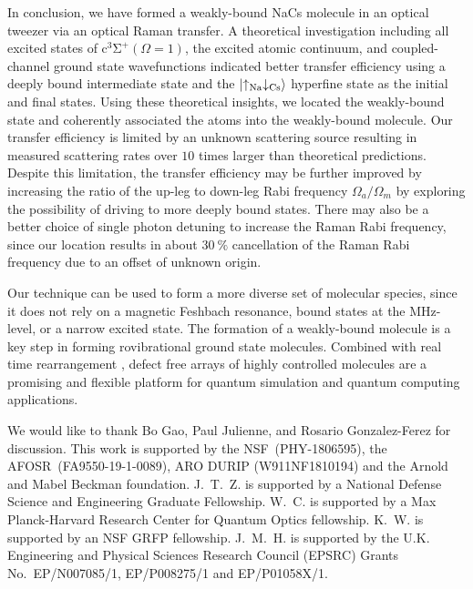 \documentclass[aps,prl,twocolumn,10pt,superscriptaddress]{revtex4-1}
\newcommand{\Na}{\mathrm{Na}}
\newcommand{\Cs}{\mathrm{Cs}}
\newcommand{\todo}[1]{}
\begin{document}
In conclusion, we have formed a weakly-bound NaCs molecule in an optical tweezer
via an optical Raman transfer.
A theoretical investigation including all excited states of $\mathrm{c^3\Sigma^+}(\Omega = 1)$,
the excited atomic continuum, and coupled-channel ground state wavefunctions indicated
better transfer efficiency using a deeply bound intermediate state
and the $\ket{\uparrow_{\Na} \downarrow_{\Cs} }$ hyperfine state as the initial and final states.
Using these theoretical insights, we located the weakly-bound state
and coherently associated the atoms into the weakly-bound molecule.
Our transfer efficiency is limited by an unknown scattering source
resulting in measured scattering rates over $10$ times larger than theoretical predictions.
Despite this limitation, the transfer efficiency may be further improved
by increasing the ratio of the up-leg to down-leg Rabi frequency
$\Omega_a/\Omega_m$ by exploring the possibility of
driving to more deeply bound states.
There may also be a better choice of single photon detuning to increase the Raman Rabi frequency,
since our location results in about $30~\mathrm{\%}$ cancellation of the Raman Rabi frequency
due to an offset of unknown origin.

Our technique can be used to form a more diverse set of molecular species,
since it does not rely on a magnetic Feshbach resonance, bound states at the MHz-level,
or a narrow excited state. The formation of a weakly-bound molecule is a key step
in forming rovibrational ground state molecules.
Combined with real time rearrangement \cite{Barredo2016, Endres2016},
defect free arrays of highly controlled molecules are a promising
and flexible platform for quantum simulation and quantum computing applications.

\todo{sm: STIRAP vs Raman}

\begin{acknowledgments}
  We would like to thank Bo Gao,  Paul Julienne, and Rosario Gonzalez-Ferez for discussion. This work is supported by the NSF~(PHY-1806595), the AFOSR~(FA9550-19-1-0089), ARO DURIP (W911NF1810194) and the Arnold and Mabel Beckman foundation. J.~T.~Z. is supported by a National Defense Science and Engineering Graduate Fellowship. W.~C. is supported by a Max Planck-Harvard Research Center for Quantum Optics fellowship. K.~W. is supported by an NSF GRFP fellowship. J.~M.~H. is supported by the U.K. Engineering and Physical Sciences Research Council (EPSRC) Grants No.\ EP/N007085/1, EP/P008275/1 and EP/P01058X/1.
\end{acknowledgments}



\end{document}
